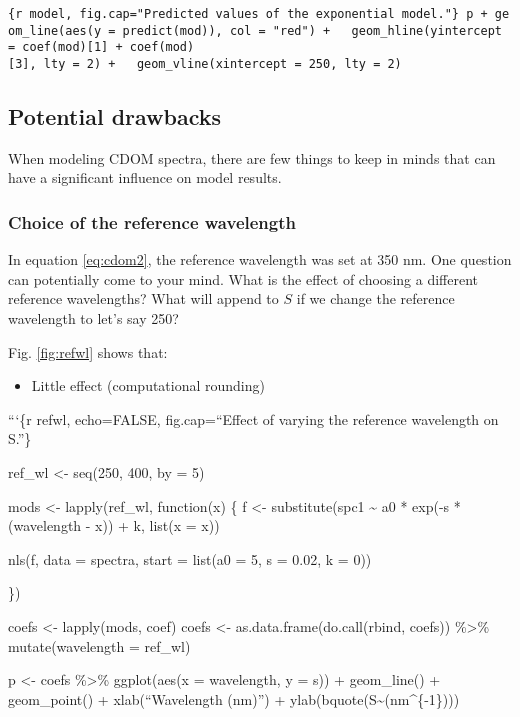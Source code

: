 \documentclass[]{book}
\providecommand{\tightlist}{%
  \setlength{\itemsep}{0pt}\setlength{\parskip}{0pt}}
\theoremstyle{definition}
\theoremstyle{definition}
\theoremstyle{remark}
\begin{document}
\texttt{\{r\ model,\ fig.cap="Predicted\ values\ of\ the\ exponential\ model."\}\ p\ +\ geom\_line(aes(y\ =\ predict(mod)),\ col\ =\ "red")\ +\ \ \ geom\_hline(yintercept\ =\ coef(mod){[}1{]}\ +\ coef(mod){[}3{]},\ lty\ =\ 2)\ +\ \ \ geom\_vline(xintercept\ =\ 250,\ lty\ =\ 2)}

\subsection{Potential drawbacks}\label{potential-drawbacks}

When modeling CDOM spectra, there are few things to keep in minds that
can have a significant influence on model results.

\subsubsection{Choice of the reference
wavelength}\label{choice-of-the-reference-wavelength}

In equation \eqref{eq:cdom2}, the reference wavelength was set at 350 nm.
One question can potentially come to your mind. What is the effect of
choosing a different reference wavelengths? What will append to \(S\) if
we change the reference wavelength to let's say 250?

Fig. \ref{fig:refwl} shows that:

\begin{itemize}
\tightlist
\item
  Little effect (computational rounding)
\end{itemize}

```\{r refwl, echo=FALSE, fig.cap=``Effect of varying the reference
wavelength on S.''\}

ref\_wl \textless{}- seq(250, 400, by = 5)

mods \textless{}- lapply(ref\_wl, function(x) \{ f \textless{}-
substitute(spc1 \textasciitilde{} a0 * exp(-s * (wavelength - x)) + k,
list(x = x))

nls(f, data = spectra, start = list(a0 = 5, s = 0.02, k = 0))

\})

coefs \textless{}- lapply(mods, coef) coefs \textless{}-
as.data.frame(do.call(rbind, coefs)) \%\textgreater{}\%
mutate(wavelength = ref\_wl)

p \textless{}- coefs \%\textgreater{}\% ggplot(aes(x = wavelength, y =
s)) + geom\_line() + geom\_point() + xlab(``Wavelength (nm)'') +
ylab(bquote(S\textasciitilde{}(nm\^{}\{-1\})))
\end{document}

